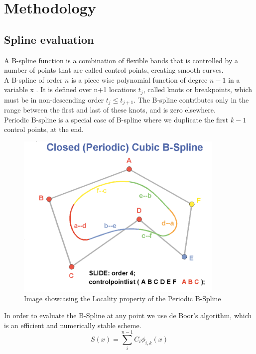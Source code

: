 \documentclass[main.tex]{subfiles}
\begin{document}
\chapter{Methodology}

\section{Spline evaluation}
A B-spline function is a combination of flexible bands that is controlled by a number of points that are called control points, creating smooth curves.\\

A B-spline of order $n$ is a piece wise polynomial function of degree {$n−1$}  in a variable x . It is defined over n+1  locations  {$t_{j}$}, called knots or breakpoints, which must be in non-descending order  { $t_{j}\leq t_{j+1}$}. The B-spline contributes only in the range between the first and last of these knots, and is zero elsewhere.\\


Periodic B-spline is a special case of B-spline where we duplicate the first $k-1$ control points, at the end.

\begin{figure}[H]
    \centering
    \includegraphics[width=10cm]{presentationImages/BsplineLocality.png}
    \caption{Image showcasing the Locality property of the Periodic B-Spline}
\end{figure}


In order to evaluate the B-Spline at any point we use de Boor's algorithm, which is an efficient and numerically stable scheme.\\

\begin{equation}
    S(x) = \sum_{i}^{n-1}C_{i}\phi_{i, k}(x)
\end{equation}
\end{document}
